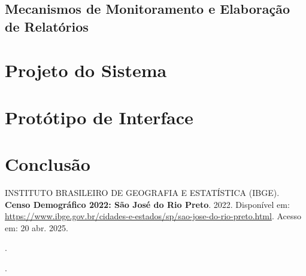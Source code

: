 \documentclass[a4paper, 12pt]{article}
\begin{document}
\subsection{Mecanismos de Monitoramento e Elaboração de Relatórios}

\section{Projeto do Sistema}

\newpage
\section{Protótipo de Interface}

\newpage
\section{Conclusão}

\newpage
\renewcommand{\refname}{Bibliografia}
\begin{thebibliography}{09}
 INSTITUTO BRASILEIRO DE GEOGRAFIA E ESTATÍSTICA (IBGE). 
\textbf{Censo Demográfico 2022: São José do Rio Preto}. 
2022. 
Disponível em: \url{https://www.ibge.gov.br/cidades-e-estados/sp/sao-jose-do-rio-preto.html}. 
Acesso em: 20 abr. 2025.

\bibitem{} %
\textbf{}. %

\bibitem{} %
\textbf{}. %

\end{thebibliography}
\end{document}

